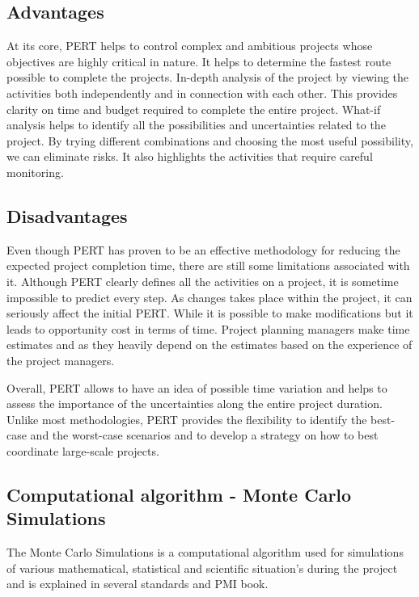 \subsection{Advantages}

At its core, PERT helps to control complex and ambitious projects whose objectives are highly critical in nature. It helps to determine the fastest route possible to complete the projects. In-depth analysis of the project by viewing the activities both independently and in connection with each other. This provides clarity on time and budget required to complete the entire project.
What-if analysis helps to identify all the possibilities and uncertainties related to the project. By trying different combinations and choosing the most useful possibility, we can eliminate risks. It also highlights the activities that require careful monitoring.


\subsection{Disadvantages}

Even though PERT has proven to be an effective methodology for reducing the expected project completion time, there are still some limitations associated with it.
Although PERT clearly defines all the activities on a project, it is sometime impossible to predict every step. As changes takes place within the project, it can seriously affect the initial PERT. While it is possible to make modifications but it leads to opportunity cost in terms of time.
Project planning managers make time estimates and as they heavily depend on the estimates based on the experience of the project managers.

Overall, PERT allows to have an idea of possible time variation and helps to assess the importance of the uncertainties along the entire project duration. Unlike most methodologies, PERT provides the flexibility to identify the best-case and the worst-case scenarios and to develop a strategy on how to best coordinate large-scale projects. 


\subsection{Computational algorithm - Monte Carlo Simulations}

The Monte Carlo Simulations is a computational algorithm used for simulations of various mathematical, statistical and scientific situation's during the project and is explained in several standards and PMI book\cite{Sandra}.

